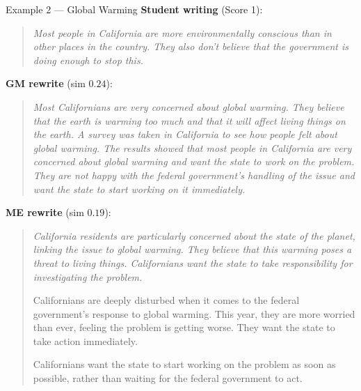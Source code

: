 \begin{examplebox}{Example 2 --- Global Warming}
\textbf{Student writing} (Score 1):

\begin{quote}\itshape
Most people in California are more environmentally conscious than in other places in the country. They also don't believe that the government is doing enough to stop this.
\end{quote}

\textbf{GM rewrite} (sim $0.24$):

\begin{quote}\itshape
Most Californians are very concerned about global warming. They believe that the earth is warming too much and that it will affect living things on the earth. A survey was taken in California to see how people felt about global warming. The results showed that most people in California are very concerned about global warming and want the state to work on the problem. They are not happy with the federal government's handling of the issue and want the state to start working on it immediately.
\end{quote}

\textbf{ME rewrite} (sim $0.19$):

\begin{quote}\itshape
California residents are particularly concerned about the state of the planet, linking the issue to global warming. They believe that this warming poses a threat to living things. Californians want the state to take responsibility for investigating the problem.

Californians are deeply disturbed when it comes to the federal government's response to global warming. This year, they are more worried than ever, feeling the problem is getting worse. They want the state to take action immediately.

Californians want the state to start working on the problem as soon as possible, rather than waiting for the federal government to act.
\end{quote}
\end{examplebox}
\label{ex:global-warming}

